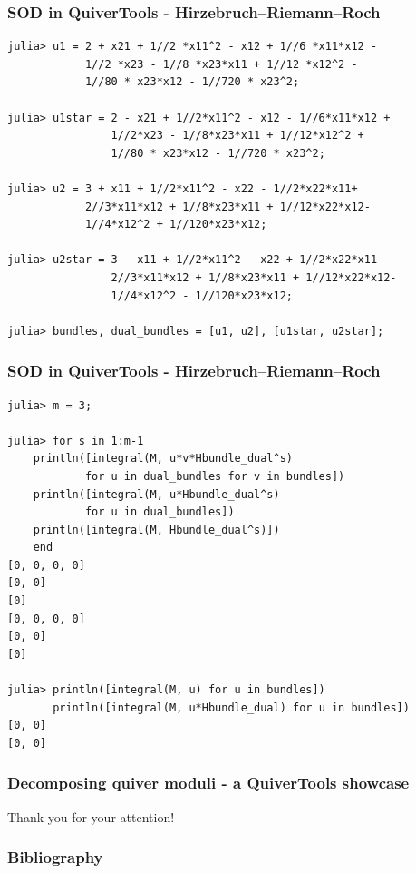 \documentclass{beamer}
\begin{document}
\begin{frame}[fragile]
    \frametitle{SOD in QuiverTools - Hirzebruch--Riemann--Roch}
\scriptsize{
\begin{lstlisting}
julia> u1 = 2 + x21 + 1//2 *x11^2 - x12 + 1//6 *x11*x12 -
            1//2 *x23 - 1//8 *x23*x11 + 1//12 *x12^2 -
            1//80 * x23*x12 - 1//720 * x23^2;

julia> u1star = 2 - x21 + 1//2*x11^2 - x12 - 1//6*x11*x12 +
                1//2*x23 - 1//8*x23*x11 + 1//12*x12^2 +
                1//80 * x23*x12 - 1//720 * x23^2;

julia> u2 = 3 + x11 + 1//2*x11^2 - x22 - 1//2*x22*x11+
            2//3*x11*x12 + 1//8*x23*x11 + 1//12*x22*x12-
            1//4*x12^2 + 1//120*x23*x12;

julia> u2star = 3 - x11 + 1//2*x11^2 - x22 + 1//2*x22*x11-
                2//3*x11*x12 + 1//8*x23*x11 + 1//12*x22*x12-
                1//4*x12^2 - 1//120*x23*x12;

julia> bundles, dual_bundles = [u1, u2], [u1star, u2star];
\end{lstlisting}
}
\end{frame}

\begin{frame}[fragile]
    \frametitle{SOD in QuiverTools - Hirzebruch--Riemann--Roch}
\scriptsize{
\begin{lstlisting}
julia> m = 3;

julia> for s in 1:m-1
    println([integral(M, u*v*Hbundle_dual^s)
            for u in dual_bundles for v in bundles])
    println([integral(M, u*Hbundle_dual^s)
            for u in dual_bundles])
    println([integral(M, Hbundle_dual^s)])
    end
[0, 0, 0, 0]
[0, 0]
[0]
[0, 0, 0, 0]
[0, 0]
[0]

julia> println([integral(M, u) for u in bundles])
       println([integral(M, u*Hbundle_dual) for u in bundles])
[0, 0]
[0, 0]       
\end{lstlisting}
}
\end{frame}
\begin{frame}
    \frametitle{Decomposing quiver moduli - a QuiverTools showcase}
\begin{center}
    Thank you for your attention! \cite{rigidity-paper}
\end{center}
\end{frame}

\begin{frame}
    \frametitle{Bibliography}

\printbibliography

\end{frame}
\end{document}
